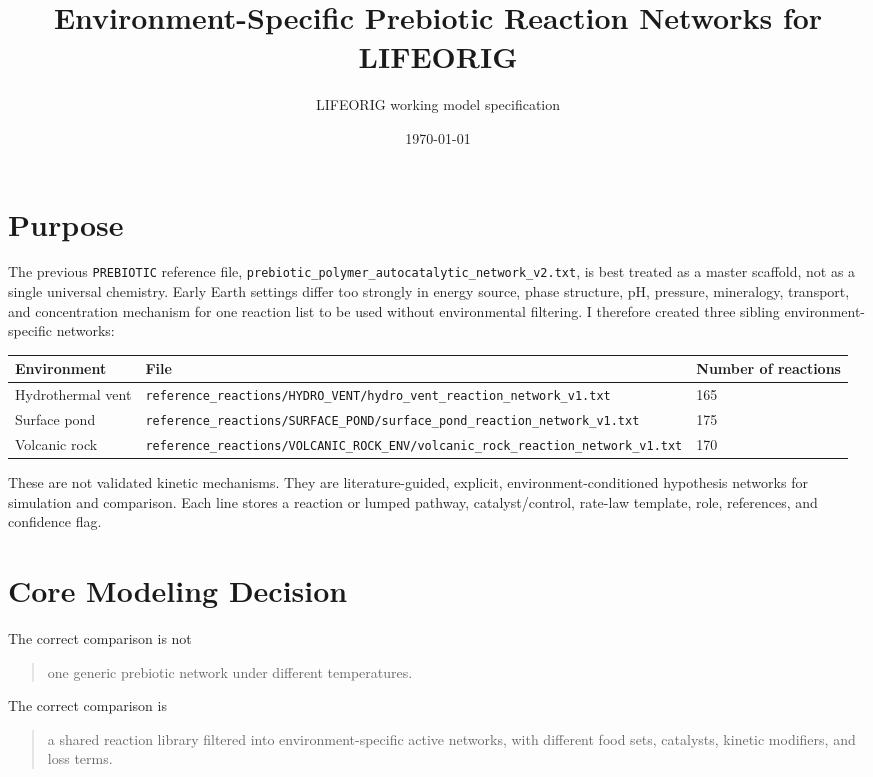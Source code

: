 \documentclass[11pt]{article}
\title{Environment-Specific Prebiotic Reaction Networks for LIFEORIG}
\author{LIFEORIG working model specification}
\date{\today}
\begin{document}
\maketitle

\section{Purpose}

The previous \texttt{PREBIOTIC} reference file,
\texttt{prebiotic\_polymer\_autocatalytic\_network\_v2.txt}, is best treated
as a master scaffold, not as a single universal chemistry.  Early Earth
settings differ too strongly in energy source, phase structure, pH, pressure,
mineralogy, transport, and concentration mechanism for one reaction list to be
used without environmental filtering.  I therefore created three sibling
environment-specific networks:

\begin{center}
\begin{tabular}{lll}
\toprule
Environment & File & Number of reactions \\
\midrule
Hydrothermal vent &
\texttt{reference\_reactions/HYDRO\_VENT/hydro\_vent\_reaction\_network\_v1.txt} &
165 \\
Surface pond &
\texttt{reference\_reactions/SURFACE\_POND/surface\_pond\_reaction\_network\_v1.txt} &
175 \\
Volcanic rock &
\texttt{reference\_reactions/VOLCANIC\_ROCK\_ENV/volcanic\_rock\_reaction\_network\_v1.txt} &
170 \\
\bottomrule
\end{tabular}
\end{center}

These are not validated kinetic mechanisms.  They are literature-guided,
explicit, environment-conditioned hypothesis networks for simulation and
comparison.  Each line stores a reaction or lumped pathway, catalyst/control,
rate-law template, role, references, and confidence flag.

\section{Core Modeling Decision}

The correct comparison is not
\begin{quote}
one generic prebiotic network under different temperatures.
\end{quote}

The correct comparison is
\begin{quote}
a shared reaction library filtered into environment-specific active networks,
with different food sets, catalysts, kinetic modifiers, and loss terms.
\end{quote}
\end{document}
